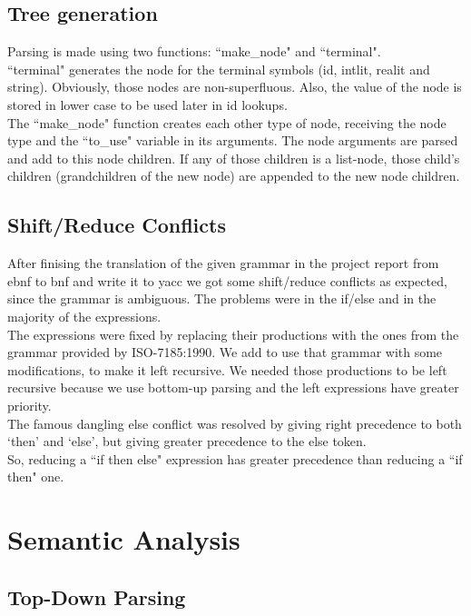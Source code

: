 \documentclass[12pt]{article}
\begin{document}
\subsection{Tree generation}

Parsing is made using two functions: ``make\_node" and ``terminal". \\
``terminal" generates the node for the terminal symbols (id, intlit, realit and string). Obviously, those nodes are non-superfluous. Also, the value of the node is stored in lower case to be used later in id lookups.\\
The ``make\_node" function creates each other type of node, receiving the node type and the ``to\_use" variable in its arguments. The node arguments are parsed and add to this node children. If any of those children is a list-node, those child's children (grandchildren of the new node) are appended to the new node children.\\

\subsection{Shift/Reduce Conflicts}

After finising the translation of the given grammar in the project report from ebnf to bnf and write it to yacc we got some shift/reduce conflicts as expected, since the grammar is ambiguous. The problems were in the if/else and in the majority of the expressions. \\
The expressions were fixed by replacing their productions with the ones from the grammar provided by ISO-7185:1990. We add to use that grammar with some modifications, to make it left recursive. We needed those productions to be left recursive because we use bottom-up parsing and the left expressions have greater priority.\\
The famous dangling else conflict was resolved by giving right precedence to both `then' and `else', but giving greater precedence to the else token. \\
So, reducing a ``if then else" expression has greater precedence than reducing a ``if then" one. \\


\section{Semantic Analysis}

\subsection{Top-Down Parsing}
\end{document}
